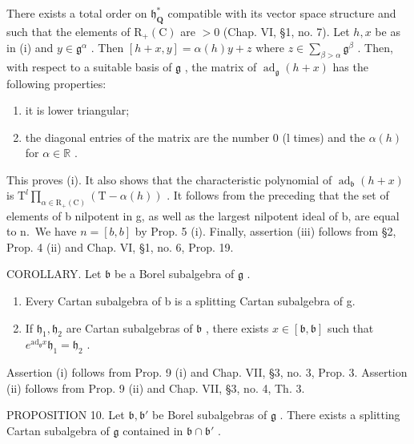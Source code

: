 There exists a total order on \(\mathfrak{h}_{\mathbf{Q}}^{*}\) compatible with its vector space structure and such that the elements of \(\mathrm{R}_{+}(\mathrm{C})\) are \(>0\) (Chap. VI, §1, no. 7). Let \(h, x\) be as in (i) and \(y \in \mathfrak{g}^{\alpha}\) . Then \([h + x, y] = \alpha(h)y + z\) where \(z \in \sum_{\beta > \alpha} \mathfrak{g}^{\beta}\) . Then, with respect to a suitable basis of \(\mathfrak{g}\) , the matrix of \(\operatorname{ad}_{\mathfrak{g}}(h + x)\) has the following properties:

\begin{enumerate}
\def\labelenumi{\arabic{enumi})}
\item
  it is lower triangular;
\item
  the diagonal entries of the matrix are the number 0 (l times) and the \(\alpha(h)\) for \(\alpha \in \mathbb{R}\) .
\end{enumerate}

This proves (i). It also shows that the characteristic polynomial of \(\operatorname{ad}_{\mathfrak{b}}(h+x)\) is \(\mathrm{T}^{l}\prod_{\alpha\in\mathrm{R}_{+}(\mathrm{C})}(\mathrm{T}-\alpha(h))\) . It follows from the preceding that the set of elements of b nilpotent in g, as well as the largest nilpotent ideal of b, are equal to n.~We have \(n=[b,b]\) by Prop. 5 (i). Finally, assertion (iii) follows from §2, Prop. 4 (ii) and Chap. VI, §1, no. 6, Prop. 19.

COROLLARY. Let \(\mathfrak{b}\) be a Borel subalgebra of \(\mathfrak{g}\) .

\begin{enumerate}
\def\labelenumi{(\roman{enumi})}
\item
  Every Cartan subalgebra of b is a splitting Cartan subalgebra of g.
\item
  If \(\mathfrak{h}_1, \mathfrak{h}_2\) are Cartan subalgebras of \(\mathfrak{b}\) , there exists \(x \in [\mathfrak{b}, \mathfrak{b}]\) such that \(e^{\mathrm{ad}_{\mathfrak{g}} x} \mathfrak{h}_1 = \mathfrak{h}_2\) .
\end{enumerate}

Assertion (i) follows from Prop. 9 (i) and Chap. VII, §3, no. 3, Prop. 3. Assertion (ii) follows from Prop. 9 (ii) and Chap. VII, §3, no. 4, Th. 3.

PROPOSITION 10. Let \(\mathfrak{b},\mathfrak{b}'\) be Borel subalgebras of \(\mathfrak{g}\) . There exists a splitting Cartan subalgebra of \(\mathfrak{g}\) contained in \(\mathfrak{b} \cap \mathfrak{b}'\) .

